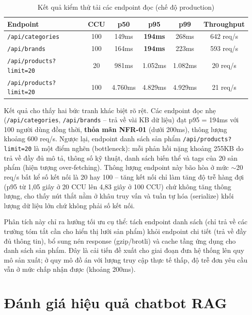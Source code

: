 \begin{table}[H]
  \centering
  \caption{Kết quả kiểm thử tải các endpoint đọc (chế độ production)}
  \label{tab:load_test}
  \footnotesize
  \begin{tabular}{|l|c|c|c|c|c|}
    \hline
    \textbf{Endpoint} & \textbf{CCU} & \textbf{p50} & \textbf{p95} & \textbf{p99} & \textbf{Throughput} \\
    \hline
    \texttt{/api/categories} & 100 & 149ms & \textbf{194ms} & 268ms & 642 req/s \\
    \hline
    \texttt{/api/brands} & 100 & 164ms & \textbf{194ms} & 223ms & 593 req/s \\
    \hline
    \texttt{/api/products?limit=20} & 20 & 981ms & 1.052ms & 1.082ms & 20 req/s \\
    \hline
    \texttt{/api/products?limit=20} & 100 & 4.760ms & 4.829ms & 4.929ms & 21 req/s \\
    \hline
  \end{tabular}
  \normalsize
\end{table}

Kết quả cho thấy hai bức tranh khác biệt rõ rệt. Các endpoint đọc nhẹ (\texttt{/api/categories}, \texttt{/api/brands} -- trả về vài KB dữ liệu) đạt p95 = 194ms với 100 người dùng đồng thời, \textbf{thỏa mãn NFR-01} (dưới 200ms), thông lượng khoảng 600 req/s. Ngược lại, endpoint danh sách sản phẩm \texttt{/api/products?limit=20} là một điểm nghẽn (bottleneck): mỗi phản hồi nặng khoảng 255KB do trả về đầy đủ mô tả, thông số kỹ thuật, danh sách biến thể và tags của 20 sản phẩm (hiện tượng over-fetching). Thông lượng endpoint này bão hòa ở mức $\sim$20 req/s bất kể số kết nối là 20 hay 100 -- tăng kết nối chỉ làm tăng độ trễ hàng đợi (p95 từ 1,05 giây ở 20 CCU lên 4,83 giây ở 100 CCU) chứ không tăng thông lượng, cho thấy nút thắt nằm ở khâu truy vấn và tuần tự hóa (serialize) khối lượng dữ liệu lớn chứ không phải số kết nối.

Phân tích này chỉ ra hướng tối ưu cụ thể: tách endpoint danh sách (chỉ trả về các trường tóm tắt cần cho hiển thị lưới sản phẩm) khỏi endpoint chi tiết (trả về đầy đủ thông tin), bổ sung nén response (gzip\slash brotli) và cache tầng ứng dụng cho danh sách sản phẩm. Đây là cải tiến đề xuất cho giai đoạn đưa hệ thống lên quy mô sản xuất; ở quy mô đồ án với lượng truy cập thực tế thấp, độ trễ đơn yêu cầu vẫn ở mức chấp nhận được (khoảng 200ms).

\section{Đánh giá hiệu quả chatbot RAG}
\label{sec:c4_rag_evaluation}

